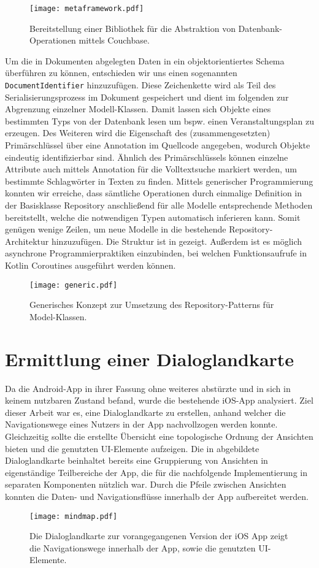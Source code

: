 \begin{figure}[H]
    \texttt{[image: metaframework.pdf]}
    \vspace{-25mm}
    \caption{Bereitstellung einer Bibliothek für die Abstraktion von Datenbank-Operationen mittels Couchbase.}\label{fig:metaframework}
\end{figure}


Um die in Dokumenten abgelegten Daten in ein objektorientiertes Schema überführen zu können, entschieden wir uns einen sogenannten
\texttt{DocumentIdentifier} hinzuzufügen. Diese Zeichenkette wird als Teil des Serialisierungsprozess im Dokument gespeichert und dient im folgenden zur Abgrenzung einzelner Modell-Klassen. Damit lassen sich Objekte eines bestimmten Typs von der Datenbank lesen um bspw. einen Veranstaltungsplan zu erzeugen. Des Weiteren wird die Eigenschaft des (zusammengesetzten) Primärschlüssel über eine Annotation im Quellcode angegeben, wodurch Objekte eindeutig identifizierbar sind. Ähnlich des Primärschlüssels können einzelne Attribute auch mittels Annotation für die Volltextsuche markiert werden, um bestimmte Schlagwörter in Texten zu finden. Mittels generischer Programmierung konnten wir erreiche, dass sämtliche Operationen durch einmalige Definition in der Basisklasse Repository anschließend für alle Modelle entsprechende Methoden bereitstellt, welche die notwendigen Typen automatisch inferieren kann. Somit genügen wenige Zeilen, um neue Modelle in die bestehende Repository-Architektur hinzuzufügen. Die Struktur ist in  gezeigt. Außerdem ist es möglich asynchrone Programmierpraktiken einzubinden, bei welchen Funktionsaufrufe in Kotlin Coroutines ausgeführt werden können.

\begin{figure}[H]
    \texttt{[image: generic.pdf]}
    \caption{Generisches Konzept zur Umsetzung des Repository-Patterns für Model-Klassen.}\label{fig:generic}
\end{figure}

\section{Ermittlung einer Dialoglandkarte}\label{se:map}

Da die Android-App in ihrer Fassung ohne weiteres abstürzte und in sich in keinem nutzbaren Zustand befand, wurde die bestehende iOS-App analysiert. Ziel dieser Arbeit war es, eine Dialoglandkarte zu erstellen, anhand welcher die Navigationswege eines Nutzers in der App nachvollzogen werden konnte. Gleichzeitig sollte die erstellte Übersicht eine topologische Ordnung der Ansichten bieten und die genutzten UI-Elemente aufzeigen. Die in  abgebildete Dialoglandkarte beinhaltet bereits eine Gruppierung von Ansichten in eigenständige Teilbereiche der App, die für die nachfolgende Implementierung in separaten Komponenten nützlich war. Durch die Pfeile zwischen Ansichten konnten die Daten- und Navigationsflüsse innerhalb der App aufbereitet werden. 

\begin{figure}[H]
    \texttt{[image: mindmap.pdf]}
    \caption{Die Dialoglandkarte zur vorangegangenen Version der iOS App zeigt die Navigationswege innerhalb der App, sowie die genutzten UI-Elemente.}\label{fig:mindmap}
\end{figure}
